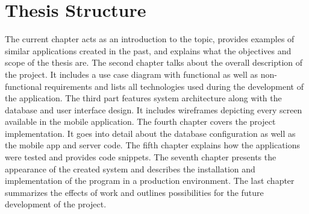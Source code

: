 \section{Thesis Structure}
The current chapter acts as an introduction to the topic, provides examples of similar applications created in the past, and explains what the objectives and scope of the thesis are. The second chapter talks about the overall description of the project. It includes a use case diagram with functional as well as non-functional requirements and lists all technologies used during the development of the application. The third part features system architecture along with the database and user interface design. It includes wireframes depicting every screen available in the mobile application. The fourth chapter covers the project implementation. It goes into detail about the database configuration as well as the mobile app and server code. The fifth chapter explains how the applications were tested and provides code snippets. The seventh chapter presents the appearance of the created system and describes the installation and implementation of the program in a production environment. The last chapter summarizes the effects of work and outlines possibilities for the future development of the project.
